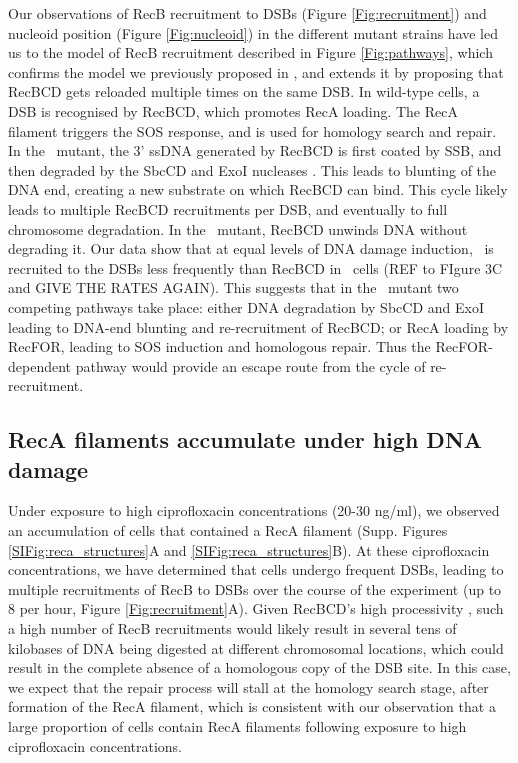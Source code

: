 Our observations of RecB recruitment to DSBs (Figure \ref{Fig:recruitment}) and nucleoid position (Figure \ref{Fig:nucleoid}) in the different mutant strains have led us to the model of RecB recruitment described in Figure \ref{Fig:pathways}, which confirms the model we previously proposed in \cite{Lepore2025}, and extends it by proposing that RecBCD gets reloaded multiple times on the same DSB. In wild-type cells, a DSB is recognised by RecBCD, which promotes RecA loading. The RecA filament triggers the SOS response, and is used for homology search and repair. In the \dreca\ mutant, the 3' ssDNA generated by RecBCD is first coated by SSB, and then degraded by the SbcCD and ExoI nucleases \cite{Zahradka2009}. This leads to blunting of the DNA end, creating a new substrate on which RecBCD can bind. This cycle likely leads to multiple RecBCD recruitments per DSB, and eventually to full chromosome degradation. In the \geneteneighty\ mutant, RecBCD unwinds DNA without degrading it. Our data show that at equal levels of DNA damage induction, \teneighty\ is recruited to the DSBs less frequently than RecBCD in \dreca\ cells (REF to FIgure 3C and GIVE THE RATES AGAIN). This suggests that in the \geneteneighty\ mutant two competing pathways take place: either DNA degradation by SbcCD and ExoI leading to DNA-end blunting and re-recruitment of RecBCD; or RecA loading by RecFOR, leading to SOS induction and homologous repair. Thus the RecFOR-dependent pathway would provide an escape route from the cycle of re-recruitment.

\subsection*{RecA filaments accumulate under high DNA damage}
Under exposure to high ciprofloxacin concentrations (20-30 ng/ml), we observed an accumulation of cells that contained a RecA filament (Supp. Figures \ref{SIFig:reca_structures}A and \ref{SIFig:reca_structures}B). At these ciprofloxacin concentrations, we have determined that cells undergo frequent DSBs, leading to multiple recruitments of RecB to DSBs over the course of the experiment (up to 8 per hour, Figure \ref{Fig:recruitment}A). Given RecBCD's high processivity \cite{Wiktor2018}, such a high number of RecB recruitments would likely result in several tens of kilobases of DNA being digested at different chromosomal locations, which could result in the complete absence of a homologous copy of the DSB site. In this case, we expect that the repair process will stall at the homology search stage, after formation of the RecA filament, which is consistent with our observation that a large proportion of cells contain RecA filaments following exposure to high ciprofloxacin concentrations.

